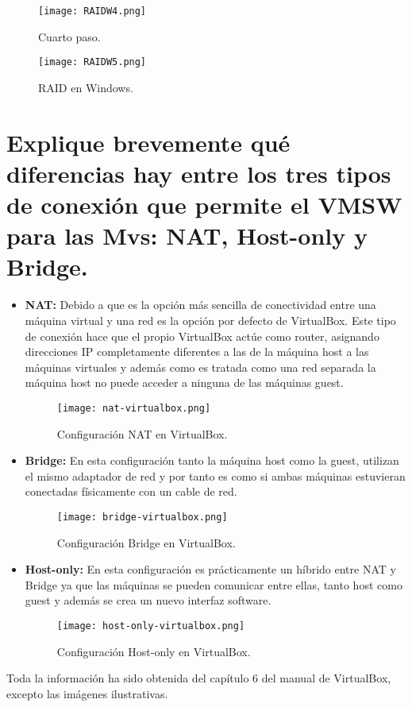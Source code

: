 \begin{figure}[H]
	\centering
	\texttt{[image: RAIDW4.png]}
	\caption{Cuarto paso. \label{fig:figura8}}
\end{figure}

\begin{figure}[H]
	\centering
	\texttt{[image: RAIDW5.png]}
	\caption{RAID en Windows. \label{fig:figura9}}
\end{figure}

\section{Explique brevemente qué diferencias hay entre los tres tipos de conexión que permite el VMSW para las Mvs: NAT, Host-only y Bridge.}

\begin{itemize}
	\item \textbf{NAT:} Debido a que es la opción más sencilla de conectividad entre una máquina virtual y una red es la opción por defecto de VirtualBox. Este tipo de conexión hace que el propio VirtualBox actúe como router, asignando direcciones IP completamente diferentes a las de la máquina host a las máquinas virtuales y además como es tratada como una red separada la máquina host no puede acceder a ninguna de las máquinas guest.
		\begin{figure}[H]
			\centering
			\texttt{[image: nat-virtualbox.png]}
			\caption{Configuración NAT en VirtualBox.\cite{figura141} \label{fig:figura2}}
		\end{figure}
	\item \textbf{Bridge:} En esta configuración tanto la máquina host como la guest, utilizan el mismo adaptador de red y por tanto es como si ambas máquinas estuvieran conectadas físicamente con un cable de red.
		\begin{figure}[H]
			\centering
			\texttt{[image: bridge-virtualbox.png]}
			\caption{Configuración Bridge en VirtualBox.\cite{figura142} \label{fig:figura3}}
		\end{figure}
	\item \textbf{Host-only:} En esta configuración es prácticamente un híbrido entre NAT y Bridge ya que las máquinas se pueden comunicar entre ellas, tanto host como guest y además se crea un nuevo interfaz software.
		\begin{figure}[H]
			\centering
			\texttt{[image: host-only-virtualbox.png]}
			\caption{Configuración Host-only en VirtualBox.\cite{figura143} \label{fig:figura4}}
		\end{figure}
\end{itemize}

Toda la información ha sido obtenida del capítulo 6 del manual de VirtualBox, excepto las imágenes ilustrativas. 




